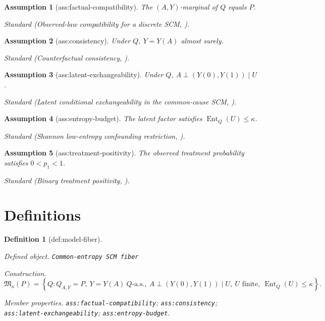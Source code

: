 \documentclass{article}
\newtheorem{assumption}{Assumption}
\newtheorem{definition}{Definition}
\begin{document}
\begin{assumption}[ass:factual-compatibility]\label{ass:factual-compatibility}
The \((A,Y)\)-marginal of \(Q\) equals \(P\).
\par\smallskip\noindent\emph{Standard} (Observed-law compatibility for a discrete SCM, \cite{DuarteFinkelsteinKnoxMummoloShpitser2024}).
\end{assumption}

\begin{assumption}[ass:consistency]\label{ass:consistency}
Under \(Q\), \(Y=Y(A)\) almost surely.
\par\smallskip\noindent\emph{Standard} (Counterfactual consistency, \cite{TianPearl2000}).
\end{assumption}

\begin{assumption}[ass:latent-exchangeability]\label{ass:latent-exchangeability}
Under \(Q\), \(A\perp (Y(0),Y(1))\mid U\).
\par\smallskip\noindent\emph{Standard} (Latent conditional exchangeability in the common-cause SCM, \cite{JiangWeiKocaoglu2023}).
\end{assumption}

\begin{assumption}[ass:entropy-budget]\label{ass:entropy-budget}
The latent factor satisfies \(\operatorname{Ent}_Q(U)\leq\kappa\).
\par\smallskip\noindent\emph{Standard} (Shannon low-entropy confounding restriction, \cite{JiangWeiKocaoglu2023}).
\end{assumption}

\begin{assumption}[ass:treatment-positivity]\label{ass:treatment-positivity}
The observed treatment probability satisfies \(0<p_1<1\).
\par\smallskip\noindent\emph{Standard} (Binary treatment positivity, \cite{TianPearl2000}).
\end{assumption}

\section{Definitions}

\begin{definition}[def:model-fiber]\label{def:model-fiber}
\par\smallskip\noindent\emph{Defined object.} \texttt{Common-\allowbreak{}entropy SCM fiber}
\par\smallskip\noindent\emph{Construction.} \[\mathfrak M_\kappa(P)=\left\{Q:Q_{A,Y}=P,\ Y=Y(A)\ Q\text{-a.s.},\ A\perp(Y(0),Y(1))\mid U,\ U\text{ finite},\ \operatorname{Ent}_Q(U)\leq\kappa\right\}.\]
\par\smallskip\noindent\emph{Member properties.} \texttt{ass:\allowbreak{}factual-\allowbreak{}compatibility}; \texttt{ass:\allowbreak{}consistency}; \texttt{ass:\allowbreak{}latent-\allowbreak{}exchangeability}; \texttt{ass:\allowbreak{}entropy-\allowbreak{}budget}.
\end{definition}
\end{document}
